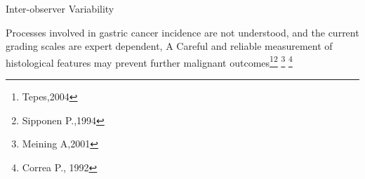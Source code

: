\documentclass[usenames,dvipsnames]{beamer}
\let\oldfootnote\footnote
\renewcommand\footnote[1][]{\footnotesize\oldfootnote[frame,#1]}
\renewcommand{\footnotesize}{\tiny}
\begin{document}
\begin{frame}{Inter-observer Variability}

\end{frame}

\begin{frame}

\begin{alertblock}{}{
 Processes involved in gastric cancer incidence are not understood, and the current grading scales are expert dependent, A Careful and reliable measurement of histological features may prevent further malignant outcomes\footnote[5]{Tepes,2004}\footnote[6]{Sipponen P.,1994} \footnote[7]{Meining A,2001} \footnote[8]{Correa P., 1992}} 

\end{alertblock}
\end{frame}
\end{document}
